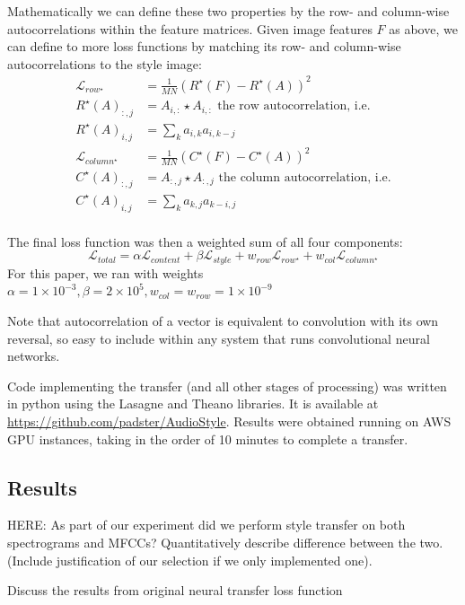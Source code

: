 \documentclass{article}
\begin{document}
Mathematically we can define these two properties by the row- and column-wise autocorrelations within the feature matrices. Given image features $F$ as above, we can define to more loss functions by matching its row- and column-wise autocorrelations to the style image:
\begin{align*}
\mathcal{L}_{row^\star} &= \frac{1}{MN} (R^\star(F) - R^\star(A))^2 \\
R^\star(A)_{:,j} &= A_{i,:} \star A_{i,:} \text{ the row autocorrelation, i.e.} \\
R^\star(A)_{i,j} &= \sum_k a_{i,k}a_{i,k-j} \\
\mathcal{L}_{column^\star} &= \frac{1}{MN} (C^\star(F) - C^\star(A))^2 \\
C^\star(A)_{:,j} &= A_{:,j} \star A_{:,j} \text{ the column autocorrelation, i.e.} \\
C^\star(A)_{i,j} &= \sum_k a_{k,j}a_{k-i,j} \\
\end{align*}

The final loss function was then a weighted sum of all four components:
$$
\mathcal{L}_{total} = \alpha \mathcal{L}_{content} + \beta \mathcal{L}_{style} + w_{row} \mathcal{L}_{row^\star} + w_{col} \mathcal{L}_{column^\star}
$$
For this paper, we ran with weights $\alpha = 1\times10^{-3}, \beta = 2\times10^{5}, w_{col} = w_{row} = 1\times10^{-9}$

Note that autocorrelation of a vector is equivalent to convolution with its own reversal, so easy to include within any system that runs convolutional neural networks.

Code implementing the transfer (and all other stages of processing) was written in python using the Lasagne and Theano libraries. It is available at \url{https://github.com/padster/AudioStyle}. Results were obtained running on AWS GPU instances, taking in the order of 10 minutes to complete a transfer. 

\subsection{Results}

HERE: As part of our experiment did we perform style transfer on both spectrograms and MFCCs? Quantitatively describe difference between the two. (Include justification of our selection if we only implemented one).

Discuss the results from original neural transfer loss function
\end{document}
